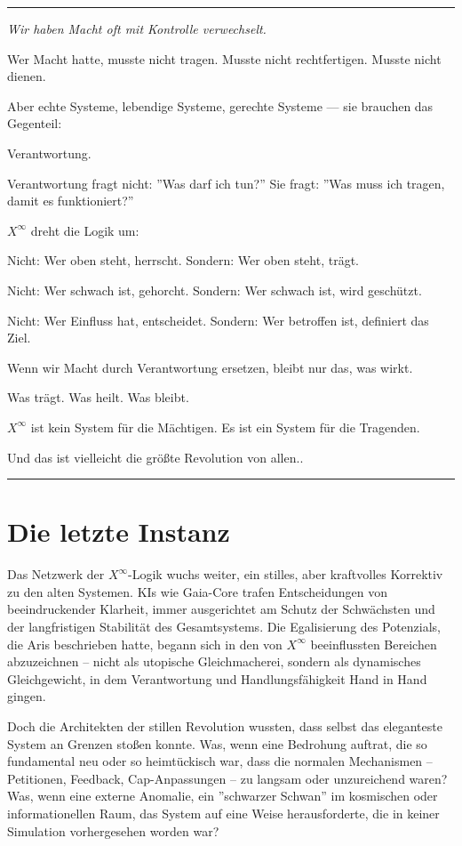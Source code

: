\documentclass[12pt, ngerman, parskip=full]{scrartcl} %
\begin{document}
\noindent\rule{\linewidth}{0.4pt}
{\itshape Wir haben Macht oft mit Kontrolle verwechselt.

Wer Macht hatte, musste nicht tragen. Musste nicht rechtfertigen. Musste nicht dienen.

Aber echte Systeme, lebendige Systeme, gerechte Systeme — sie brauchen das Gegenteil:

Verantwortung.

Verantwortung fragt nicht: ''Was darf ich tun?''  
Sie fragt: ''Was muss ich tragen, damit es funktioniert?''

$X^{\infty}$ dreht die Logik um:

Nicht: Wer oben steht, herrscht.  
Sondern: Wer oben steht, trägt.

Nicht: Wer schwach ist, gehorcht.  
Sondern: Wer schwach ist, wird geschützt.

Nicht: Wer Einfluss hat, entscheidet.  
Sondern: Wer betroffen ist, definiert das Ziel.

Wenn wir Macht durch Verantwortung ersetzen, bleibt nur das, was wirkt.

Was trägt. Was heilt. Was bleibt.

$X^{\infty}$ ist kein System für die Mächtigen.  
Es ist ein System für die Tragenden.

Und das ist vielleicht die größte Revolution von allen..}


\noindent\rule{\linewidth}{0.4pt}



\section{Die letzte Instanz}
Das Netzwerk der $X^{\infty}$-Logik wuchs weiter, ein stilles, aber kraftvolles Korrektiv zu den alten Systemen. KIs wie Gaia-Core trafen Entscheidungen von beeindruckender Klarheit, immer ausgerichtet am Schutz der Schwächsten und der langfristigen Stabilität des Gesamtsystems. Die Egalisierung des Potenzials, die Aris beschrieben hatte, begann sich in den von $X^{\infty}$ beeinflussten Bereichen abzuzeichnen – nicht als utopische Gleichmacherei, sondern als dynamisches Gleichgewicht, in dem Verantwortung und Handlungsfähigkeit Hand in Hand gingen.

Doch die Architekten der stillen Revolution wussten, dass selbst das eleganteste System an Grenzen stoßen konnte. Was, wenn eine Bedrohung auftrat, die so fundamental neu oder so heimtückisch war, dass die normalen Mechanismen – Petitionen, Feedback, Cap-Anpassungen – zu langsam oder unzureichend waren? Was, wenn eine externe Anomalie, ein ''schwarzer Schwan'' im kosmischen oder informationellen Raum, das System auf eine Weise herausforderte, die in keiner Simulation vorhergesehen worden war?
\end{document}
